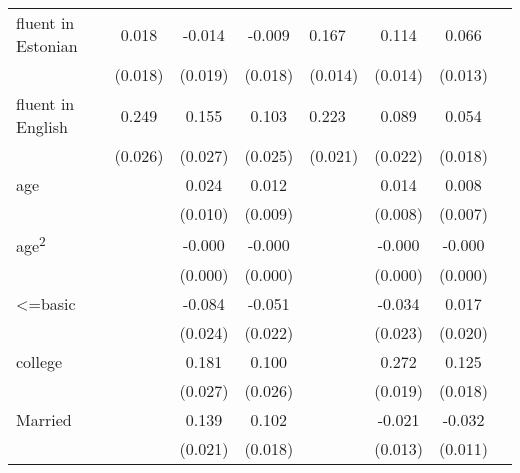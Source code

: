 \begin{longtable}{l*{3}{c}|l*{3}{c}}
	
	fluent in Estonian  &       0.018         &      -0.014         &      -0.009         &       0.167\sym{***}&       0.114\sym{***}&       0.066\sym{***}\\
	&     (0.018)         &     (0.019)         &     (0.018)         &     (0.014)         &     (0.014)         &     (0.013)         \\
	fluent in English   &       0.249\sym{***}&       0.155\sym{***}&       0.103\sym{***}&       0.223\sym{***}&       0.089\sym{***}&       0.054\sym{***}\\
	&     (0.026)         &     (0.027)         &     (0.025)         &     (0.021)         &     (0.022)         &     (0.018)         \\
	age                 &                     &       0.024\sym{**} &       0.012         &                     &       0.014\sym{*}  &       0.008         \\
	&                     &     (0.010)         &     (0.009)         &                     &     (0.008)         &     (0.007)         \\
	age\textsuperscript{2}    &                     &      -0.000\sym{***}&      -0.000\sym{*}  &                     &      -0.000\sym{**} &      -0.000         \\
	&                     &     (0.000)         &     (0.000)         &                     &     (0.000)         &     (0.000)         \\
	<=basic             &                     &      -0.084\sym{***}&      -0.051\sym{**} &                     &      -0.034         &       0.017         \\
	&                     &     (0.024)         &     (0.022)         &                     &     (0.023)         &     (0.020)         \\
	college             &                     &       0.181\sym{***}&       0.100\sym{***}&                     &       0.272\sym{***}&       0.125\sym{***}\\
	&                     &     (0.027)         &     (0.026)         &                     &     (0.019)         &     (0.018)         \\
	Married             &                     &       0.139\sym{***}&       0.102\sym{***}&                     &      -0.021         &      -0.032\sym{***}\\
	&                     &     (0.021)         &     (0.018)         &                     &     (0.013)         &     (0.011)         \\

\end{longtable}
